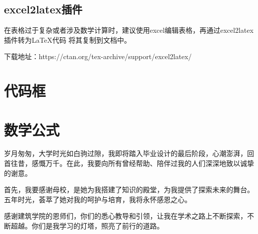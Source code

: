 \documentclass[AutoFakeBold]{ZafuThesis}
\begin{document}
\subsection{excel2latex插件}
在表格过于复杂或者涉及数学计算时，建议使用excel编辑表格，再通过excel2latex插件转为\LaTeX 代码 将其复制到文档中。
\par
下载地址：https://ctan.org/tex-archive/support/excel2latex/

\section{代码框}

\section{数学公式}


% 
% 

\Thanks
{
  岁月匆匆，大学时光如白驹过隙，我即将踏入毕业设计的最后阶段，心潮澎湃，回首往昔，感慨万千。在此，我要向所有曾经帮助、陪伴过我的人们深深地致以诚挚的谢意。\par
  首先，我要感谢母校，是她为我搭建了知识的殿堂，为我提供了探索未来的舞台。五年时光，荟萃了她对我的呵护与培育，我将永怀感恩之心。\par
  感谢建筑学院的恩师们，你们的悉心教导和引领，让我在学术之路上不断探索，不断超越。你们是我学习的灯塔，照亮了前行的道路。
}
\end{document}
